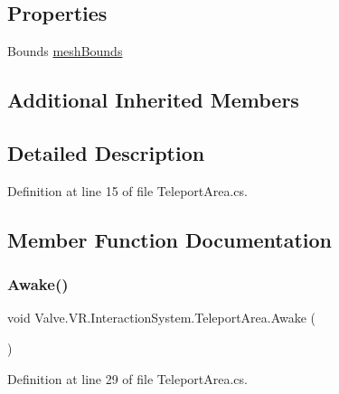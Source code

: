\subsection*{Properties}
\begin{DoxyCompactItemize}
\item 
Bounds \mbox{\hyperlink{class_valve_1_1_v_r_1_1_interaction_system_1_1_teleport_area_afead28060d4c08c26ddcc243eeac3c2d}{mesh\+Bounds}}
\end{DoxyCompactItemize}
\subsection*{Additional Inherited Members}


\subsection{Detailed Description}


Definition at line 15 of file Teleport\+Area.\+cs.



\subsection{Member Function Documentation}
\mbox{\label{class_valve_1_1_v_r_1_1_interaction_system_1_1_teleport_area_a721494a75b2e6cdabebe375b65bca58e}} 
\subsubsection{\texorpdfstring{Awake()}{Awake()}}
{\footnotesize\ttfamily void Valve.\+V\+R.\+Interaction\+System.\+Teleport\+Area.\+Awake (\begin{DoxyParamCaption}{ }\end{DoxyParamCaption})}



Definition at line 29 of file Teleport\+Area.\+cs.

\mbox{\label{class_valve_1_1_v_r_1_1_interaction_system_1_1_teleport_area_af6ccf32a483c32ef856b1f8a56bface5}} 

